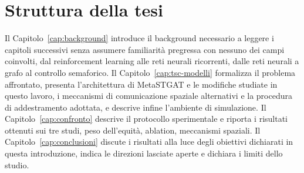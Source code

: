 \section{Struttura della tesi}

Il Capitolo~\ref{cap:background} introduce il background necessario a
leggere i capitoli successivi senza assumere familiarità pregressa con
nessuno dei campi coinvolti, dal reinforcement learning alle reti neurali
ricorrenti, dalle reti neurali a grafo al controllo semaforico. Il
Capitolo~\ref{cap:tsc-modelli} formalizza il problema affrontato,
presenta l'architettura di MetaSTGAT e le modifiche studiate in questo
lavoro, i meccanismi di comunicazione spaziale alternativi e la procedura
di addestramento adottata, e descrive infine l'ambiente di simulazione.
Il Capitolo~\ref{cap:confronto} descrive il protocollo sperimentale e
riporta i risultati ottenuti sui tre studi, peso dell'equità, ablation,
meccanismi spaziali. Il Capitolo~\ref{cap:conclusioni} discute i
risultati alla luce degli obiettivi dichiarati in questa introduzione,
indica le direzioni lasciate aperte e dichiara i limiti dello studio.
